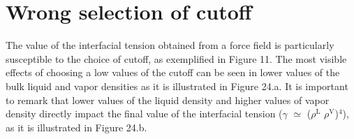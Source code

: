 \documentclass{scrbook}
\begin{document}
\section{Wrong selection of cutoff}

The value of the interfacial tension obtained from a force field is
particularly susceptible to the choice of cutoff, as exemplified in Figure 11.
The most visible effects of choosing a low values of the cutoff can be seen in
lower values of the bulk liquid and vapor densities as it is illustrated in
Figure 24.a. It is important to remark that lower values of the liquid density
and higher values of vapor density directly impact the final value of the
interfacial tension ({${\gamma}$}  ${\simeq}$ (${\rho}$$^{\mathrm{L}}$
\textendash{} ${\rho}$$^{\mathrm{V}}$)$^{4}$), as it is illustrated in Figure
24.b.
\end{document}
